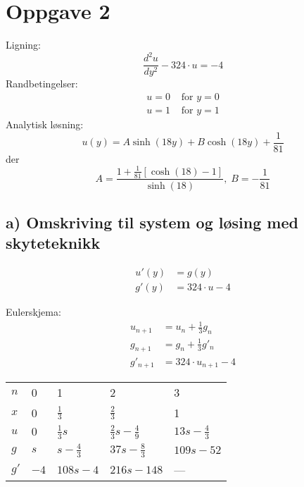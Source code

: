 

\clearpage
\section*{Oppgave 2} %
\label{sec:oppgave_2}
Ligning:
\begin{equation}
  \frac{d^2 u}{dy^2} - 324 \cdot u = -4
\end{equation}
Randbetingelser:
\begin{align}
  u = 0 & \text{ for } y = 0 \nonumber \\
  u = 1 & \text{ for } y = 1 \nonumber
\end{align}
Analytisk løsning:
\begin{equation}
  u(y) = A \sinh(18y) + B \cosh(18y) + \frac{1}{81}
\end{equation}
der
\begin{equation}
  \nonumber
  A = \dfrac{1 + \frac{1}{81} [\cosh(18)-1] }{\sinh(18)}, \; B = - \frac{1}{81}
\end{equation}


\subsection*{a) Omskriving til system og løsing med skyteteknikk} %
\label{sub:a_omskriving_til_system}

\begin{align}
  u'(y) & = g(y) \\
  g'(y) & = 324 \cdot u - 4
\end{align}

\noindent Eulerskjema:
\begin{align}
  u_{n+1}  &= u_n + \frac{1}{3} g_n   \\
  g_{n+1}  &= g_n + \frac{1}{3} g'_n  \\
  g'_{n+1} &= 324 \cdot u_{n+1} - 4
\end{align}

\begin{table}[H]
  \centering
  \begin{tabularx}{1.0\textwidth}{X|XXXX}
    \toprule
    $n$  & 0    & 1               & 2                          & 3 \\
    $x$  & 0    & $\frac{1}{3}$   & $\frac{2}{3}$              & 1 \\
    \midrule
    $u$  & $0$  & $\frac{1}{3}s$  & $\frac{2}{3}s-\frac{4}{9}$ & $13s-\frac{4}{3}$  \\
    $g$  & $s$  & $s-\frac{4}{3}$ & $37s-\frac{8}{3}$          & $109s-52$          \\
    $g'$ & $-4$ & $108s-4$        & $216s-148$                 & ---                \\
    \bottomrule
  \end{tabularx}
\end{table}


